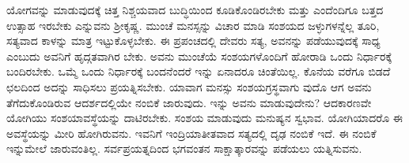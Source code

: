 ಯೋಗವನ್ನು ಮಾಡುವುದಕ್ಕೆ ಚಿತ್ತ ನಿಶ್ಚಯವಾದ ಬುದ್ಧಿಯಿಂದ ಕೂಡಿಕೊಂಡಿರಬೇಕು ಮತ್ತು ಎಂದೆಂದಿಗೂ ಬತ್ತದ ಉತ್ಸಾಹ ಇರಬೇಕು ಎನ್ನುವನು ಶ‍್ರೀಕೃಷ್ಣ. ಮುಂಚೆ ಮನಸ್ಸನ್ನು ವಿಚಾರ ಮಾಡಿ ಸಂಶಯದ ಜಳ್ಳುಗಳನ್ನೆಲ್ಲ ತೂರಿ, ಸತ್ಯವಾದ ಕಾಳನ್ನು ಮಾತ್ರ ಇಟ್ಟುಕೊಳ್ಳಬೇಕು. ಈ ಪ್ರಪಂಚದಲ್ಲಿ ದೇವರು ಸತ್ಯ, ಅವನನ್ನು ಪಡೆಯುವುದಕ್ಕೆ ಸಾಧ್ಯ ಎಂಬುದು ಅವನಿಗೆ ಹೃದ್ಗತವಾಗಿರ ಬೇಕು. ಅವನು ಮುಂಚೆಯೆ ಸಂಶಯಗಳೊಂದಿಗೆ ಹೋರಾಡಿ ಒಂದು ನಿರ್ಧಾರಕ್ಕೆ ಬಂದಿರಬೇಕು. ಒಮ್ಮೆ ಒಂದು ನಿರ್ಧಾರಕ್ಕೆ ಬಂದನೆಂದರೆ ಇನ್ನು ಏನಾದರೂ ಚಿಂತೆಯಿಲ್ಲ. ಕೊನೆಯ ವರೆಗೂ ಬಿಡದೆ ಛಲದಿಂದ ಅದನ್ನು ಸಾಧಿಸಲು ಪ್ರಯತ್ನಿಸಬೇಕು. ಯಾವಾಗ ಮನಸ್ಸು ಸಂಶಯಗ್ರಸ್ಥವಾಗು ವುದೊ ಆಗ ಅವನು ತೆಗೆದುಕೊಂಡಿರುವ ಆದರ್ಶದಲ್ಲಿಯೇ ನಂಬಿಕೆ ಜಾರುವುದು. ಇನ್ನು ಅವನು ಮಾಡುವುದೇನು? ಆದಕಾರಣವೇ ಯೋಗಿಯು ಸಂಶಯಾವಸ್ಥೆಯನ್ನು ದಾಟಿರಬೇಕು. ಸಂಶಯ ಮಾಡುವುದು ಮನುಷ್ಯನ ಸ್ವಭಾವ. ಯೋಗಿಯಾದರೊ ಈ ಅವಸ್ಥೆಯನ್ನು ಮೀರಿ ಹೋಗಿರುವನು. ಇವನಿಗೆ ಇಂದ್ರಿಯಾತೀತವಾದ ಸತ್ಯದಲ್ಲಿ ದೃಢ ನಂಬಿಕೆ ಇದೆ. ಈ ನಂಬಿಕೆ ಇನ್ನುಮೇಲೆ ಜಾರುವಂತಿಲ್ಲ. ಸರ್ವಪ್ರಯತ್ನದಿಂದ ಭಗವಂತನ ಸಾಕ್ಷಾತ್ಕಾರವನ್ನು ಪಡೆಯಲು ಯತ್ನಿಸುವನು.

